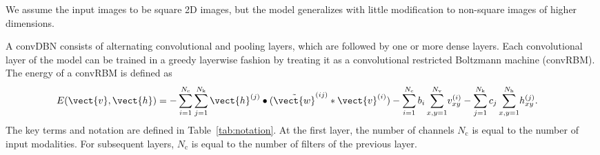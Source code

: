 We assume the input images to be square 2D images, but the model generalizes
with little modification to non-square images of higher dimensions.

A convDBN consists of alternating convolutional and pooling layers, which are
followed by one or more dense layers. Each convolutional layer of the model can
be trained in a greedy layerwise fashion by treating it as a convolutional
restricted Boltzmann machine (convRBM). The energy of a convRBM is defined as
\begin{align} 
E(\vect{v},\vect{h}) 
&= -\sum_{i=1}^{N_\text{c}} \sum_{j=1}^{N_\text{k}} \vect{h}^{(j)}
\bullet (\tilde{\vect{w}}^{(ij)} * \vect{v}^{(i)}) -
\sum_{i=1}^{N_\text{c}}b_i\sum_{x,y = 1}^{N_\text{v}}\!v_{xy}^{(i)} -
\sum_{j=1}^{N_\text{k}}c_j\sum_{x,y = 1}^{N_\text{h}}\!h_{xy}^{(j)}.
\end{align}
The key terms and notation are defined in Table~\ref{tab:notation}. At the first
layer, the number of channels $N_\text{c}$ is equal to the number of input
modalities. For subsequent layers, $N_\text{c}$ is equal to the number of
filters of the previous layer.

